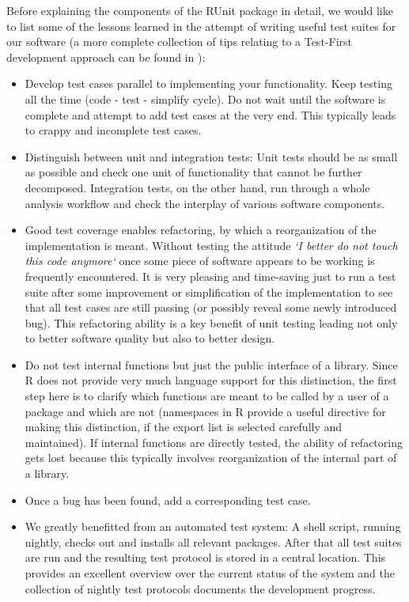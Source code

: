 \documentclass[12pt, a4paper]{article}
\begin{document}
Before explaining the components of the RUnit package in detail,
we would like to list some of the lessons learned in the attempt of
writing useful test suites for our software (a more complete collection
of tips relating to a Test-First development approach can be found in \cite{tfg}):
\begin{itemize}

\item {Develop test cases parallel to implementing your
    functionality. Keep testing all the time (code - test - simplify
    cycle). Do not wait until the software is complete and attempt to
    add test cases at the very end. This typically leads to crappy
    and incomplete test cases.}

\item{Distinguish between unit and integration tests: Unit tests
    should be as small as possible and check one unit of functionality
    that cannot be further decomposed. Integration tests, on the other
    hand, run through a whole analysis workflow and check the
    interplay of various software components.}

\item{Good test coverage enables refactoring, by which a
        reorganization of the implementation is meant. Without testing the
        attitude {\it `I better do not touch this code anymore`} once some piece
        of software appears to be working is frequently
        encountered. It is very pleasing and time-saving just to run a
        test suite after some improvement or simplification of the
        implementation to see that all test cases are still passing
        (or possibly reveal some newly introduced bug). This
        refactoring ability is a key benefit of unit testing leading
        not only to better software quality but also to better design.}

\item{Do not test internal functions but just the public interface of
    a library. Since R does not provide very much language support for this
    distinction, the first step here is to clarify which
    functions are meant to be called by a user of a package and which are
    not (namespaces in R provide a useful directive for making this distinction, if
    the export list is selected carefully and maintained). 
    If internal functions are directly tested, the ability of
    refactoring gets lost because this typically involves
    reorganization of the internal part of a library.}

\item {Once a bug has been found, add a corresponding test case.}

\item{We greatly benefitted from an automated test system: A
    shell script, running nightly, checks out and installs all relevant packages.
    After that all test suites are run and the resulting test protocol is stored
    in a central location. This provides an excellent overview over the current
    status of the system and the collection of nightly test protocols documents
    the development progress.}

\end{itemize}
\end{document}

